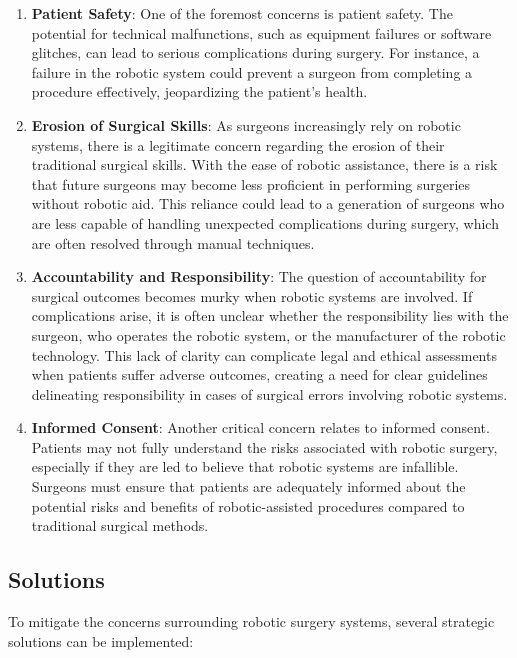 \begin{enumerate}
    \item \textbf{Patient Safety}: One of the foremost concerns is patient safety. The potential for technical malfunctions, such as equipment failures or software glitches, can lead to serious complications during surgery. For instance, a failure in the robotic system could prevent a surgeon from completing a procedure effectively, jeopardizing the patient’s health.

    \item \textbf{Erosion of Surgical Skills}: As surgeons increasingly rely on robotic systems, there is a legitimate concern regarding the erosion of their traditional surgical skills. With the ease of robotic assistance, there is a risk that future surgeons may become less proficient in performing surgeries without robotic aid. This reliance could lead to a generation of surgeons who are less capable of handling unexpected complications during surgery, which are often resolved through manual techniques.

    \item \textbf{Accountability and Responsibility}: The question of accountability for surgical outcomes becomes murky when robotic systems are involved. If complications arise, it is often unclear whether the responsibility lies with the surgeon, who operates the robotic system, or the manufacturer of the robotic technology. This lack of clarity can complicate legal and ethical assessments when patients suffer adverse outcomes, creating a need for clear guidelines delineating responsibility in cases of surgical errors involving robotic systems.

    \item \textbf{Informed Consent}: Another critical concern relates to informed consent. Patients may not fully understand the risks associated with robotic surgery, especially if they are led to believe that robotic systems are infallible. Surgeons must ensure that patients are adequately informed about the potential risks and benefits of robotic-assisted procedures compared to traditional surgical methods.
\end{enumerate}

\subsection{Solutions}
To mitigate the concerns surrounding robotic surgery systems, several strategic solutions can be implemented:


